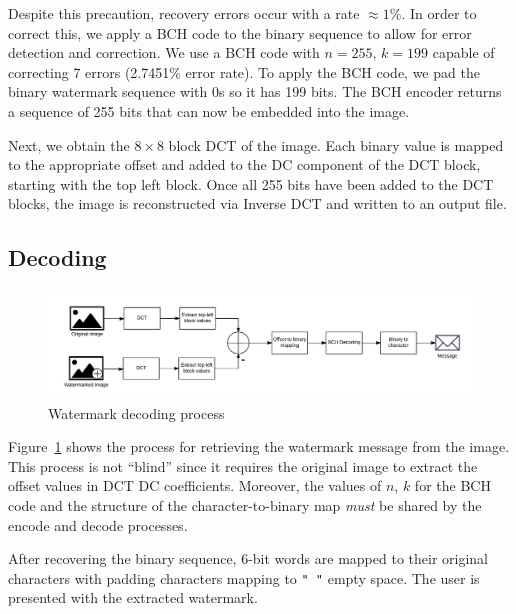 Despite this precaution, recovery errors occur with a rate $\approx 1\%$.
In order to correct this, we apply a BCH code to the binary sequence to allow for error detection and correction.
We use a BCH code with $n = 255$, $k = 199$ capable of correcting 7 errors (2.7451\% error rate).
To apply the BCH code, we pad the binary watermark sequence with 0s so it has 199 bits.
The BCH encoder returns a sequence of 255 bits that can now be embedded into the image.

Next, we obtain the $8\times8$ block DCT of the image.
Each binary value is mapped to the appropriate offset and added to the DC component of the DCT block, starting with the top left block.
Once all 255 bits have been added to the DCT blocks, the image is reconstructed via Inverse DCT and written to an output file.

\subsection{Decoding}
\begin{figure}[tbph]
  \centering
  \includegraphics[width=0.95\linewidth]{graphics/decode}
  \caption{Watermark decoding process}
  \label{fig:decode}
\end{figure}

Figure~\ref{fig:decode} shows the process for retrieving the watermark message from the image.
This process is not ``blind'' since it requires the original image to extract the offset values in DCT DC coefficients.
Moreover, the values of $n$, $k$ for the BCH code and the structure of the character-to-binary map \textit{must} be shared by the encode and decode processes.

After recovering the binary sequence, 6-bit words are mapped to their original characters with padding characters mapping to \texttt{" "} empty space.
The user is presented with the extracted watermark.

